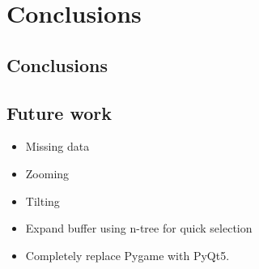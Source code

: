 \chapter{Conclusions}
\label{ch:conclusion}
\section{Conclusions}
\section{Future work}
\begin{itemize}
  \item Missing data
  \item Zooming
  \item Tilting
  \item Expand buffer using n-tree for quick selection
  \item Completely replace Pygame with PyQt5.
\end{itemize}
